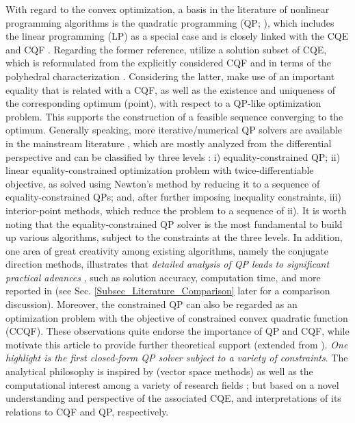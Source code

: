 \documentclass[9pt,twocolumn,twoside,lineno]{pnas-new-1}
\theoremstyle{remark}
\begin{document}
With regard to the convex optimization, a basis in the literature of nonlinear programming algorithms is the quadratic programming (QP; \cite{Lu(Ye):03(16)}), which includes the linear programming (LP) as a special case and is closely linked with the CQE and CQF \citep{PaSa:10,RaBoJoVeJo:08}. Regarding the former reference, \cite{PaSa:10} utilize a solution subset of CQE, which is reformulated from the explicitly considered CQF and in terms of the polyhedral characterization \citep{Man:88}. Considering the latter, \cite{RaBoJoVeJo:08} make use of an important equality that is related with a CQF, as well as the existence and uniqueness of the corresponding optimum (point), with respect to a QP-like optimization problem. This supports the construction of a feasible sequence converging to the optimum. Generally speaking, more iterative/numerical QP solvers are available in the mainstream literature \citep{NoWr:06}, which are mostly analyzed from the differential perspective and can be classified by three levels \citep{BoVa:04}: i) equality-constrained QP; ii) linear equality-constrained optimization problem with twice-differentiable objective, as solved using Newton's method by reducing it to a sequence of equality-constrained QPs; and, after further imposing inequality constraints, iii) interior-point methods, which reduce the problem to a sequence of ii). It is worth noting that the equality-constrained QP solver is the most fundamental to build up various algorithms, subject to the constraints at the three levels. In addition, one area of great creativity among existing algorithms, namely the conjugate direction methods, illustrates that \textit{detailed analysis of QP leads to significant practical advances} \citep{Lu(Ye):03(16)}, such as solution accuracy, computation time, and more reported in \cite{JoFoTo:05} (see Sec. \ref{Subsec_Literature_Comparison} later for a comparison discussion). Moreover, the constrained QP can also be regarded as an optimization problem with the objective of constrained convex quadratic function (CCQF). These observations quite endorse the importance of QP and CQF, while motivate this article to provide further theoretical support (extended from \cite{LiLiHs:20}). \textit{One highlight is the first closed-form QP solver subject to a variety of constraints}. The analytical philosophy is inspired by \cite{Lue:69} (vector space methods) as well as the computational interest among a variety of research fields \citep{DuJoWaWi:15,JoFo:13,Lu(Ye):03(16),RaLe:19}; but based on a novel understanding and perspective of the associated CQE, and interpretations of its relations to CQF and QP, respectively.
\end{document}
